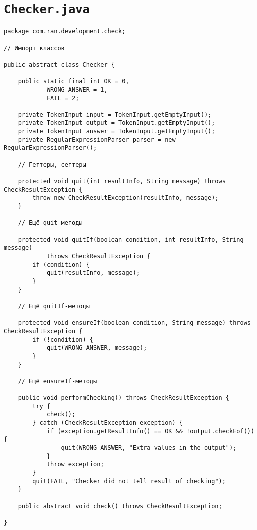 \section*{\texttt{Checker.java}}
\begin{verbatim}
package com.ran.development.check;

// Импорт классов

public abstract class Checker {

    public static final int OK = 0,
            WRONG_ANSWER = 1,
            FAIL = 2;

    private TokenInput input = TokenInput.getEmptyInput();
    private TokenInput output = TokenInput.getEmptyInput();
    private TokenInput answer = TokenInput.getEmptyInput();
    private RegularExpressionParser parser = new RegularExpressionParser();

    // Геттеры, сеттеры

    protected void quit(int resultInfo, String message) throws CheckResultException {
        throw new CheckResultException(resultInfo, message);
    }

    // Ещё quit-методы

    protected void quitIf(boolean condition, int resultInfo, String message)
            throws CheckResultException {
        if (condition) {
            quit(resultInfo, message);
        }
    }

    // Ещё quitIf-методы

    protected void ensureIf(boolean condition, String message) throws CheckResultException {
        if (!condition) {
            quit(WRONG_ANSWER, message);
        }
    }

    // Ещё ensureIf-методы

    public void performChecking() throws CheckResultException {
        try {
            check();
        } catch (CheckResultException exception) {
            if (exception.getResultInfo() == OK && !output.checkEof()) {
                quit(WRONG_ANSWER, "Extra values in the output");
            }
            throw exception;
        }
        quit(FAIL, "Checker did not tell result of checking");
    }

    public abstract void check() throws CheckResultException;

}
\end{verbatim}

